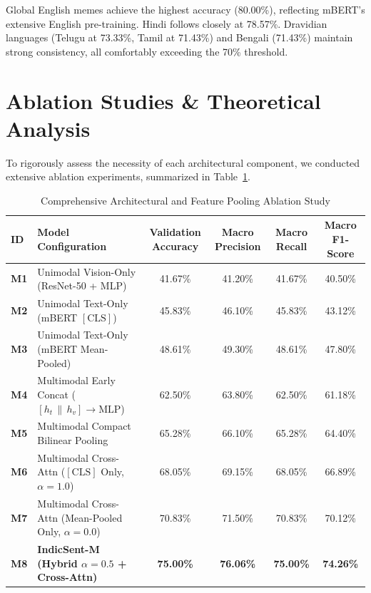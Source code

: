 \documentclass[10pt,journal,compsoc]{IEEEtran}
\begin{document}
Global English memes achieve the highest accuracy (80.00\%), reflecting mBERT's extensive English pre-training. Hindi follows closely at 78.57\%. Dravidian languages (Telugu at 73.33\%, Tamil at 71.43\%) and Bengali (71.43\%) maintain strong consistency, all comfortably exceeding the 70\% threshold.

\section{Ablation Studies \& Theoretical Analysis}
\label{sec:ablation}

To rigorously assess the necessity of each architectural component, we conducted extensive ablation experiments, summarized in Table~\ref{tab:ablation_study_extended}.

\begin{table}[!t]
\centering
\caption{Comprehensive Architectural and Feature Pooling Ablation Study}
\label{tab:ablation_study_extended}
\begin{tabular}{llcccc}
\toprule
\textbf{ID} & \textbf{Model Configuration} & \textbf{Validation Accuracy} & \textbf{Macro Precision} & \textbf{Macro Recall} & \textbf{Macro F1-Score} \\
\midrule
\textbf{M1} & Unimodal Vision-Only (ResNet-50 + MLP) & 41.67\% & 41.20\% & 41.67\% & 40.50\% \\
\textbf{M2} & Unimodal Text-Only (mBERT $[\text{CLS}]$) & 45.83\% & 46.10\% & 45.83\% & 43.12\% \\
\textbf{M3} & Unimodal Text-Only (mBERT Mean-Pooled) & 48.61\% & 49.30\% & 48.61\% & 47.80\% \\
\midrule
\textbf{M4} & Multimodal Early Concat ($[h_t \,\|\, h_v] \to \text{MLP}$) & 62.50\% & 63.80\% & 62.50\% & 61.18\% \\
\textbf{M5} & Multimodal Compact Bilinear Pooling \cite{fukui2016multimodal} & 65.28\% & 66.10\% & 65.28\% & 64.40\% \\
\textbf{M6} & Multimodal Cross-Attn ($[\text{CLS}]$ Only, $\alpha=1.0$) & 68.05\% & 69.15\% & 68.05\% & 66.89\% \\
\textbf{M7} & Multimodal Cross-Attn (Mean-Pooled Only, $\alpha=0.0$) & 70.83\% & 71.50\% & 70.83\% & 70.12\% \\
\midrule
\textbf{M8} & \textbf{IndicSent-M (Hybrid $\alpha=0.5$ + Cross-Attn)} & \textbf{75.00\%} & \textbf{76.06\%} & \textbf{75.00\%} & \textbf{74.26\%} \\
\bottomrule
\end{tabular}
\end{table}
\end{document}
